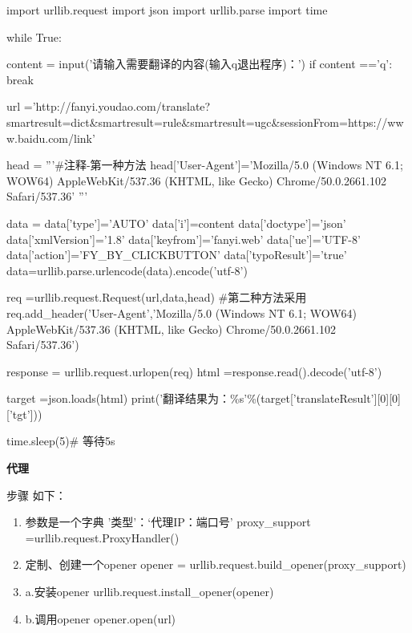 \documentclass[a4paper,10pt]{ctexart}
\begin{document}
\begin{python}

import urllib.request
import json
import urllib.parse
import time


while True:

      content = input('请输入需要翻译的内容(输入q退出程序)：')
      if content =='q':
            break


      url ='http://fanyi.youdao.com/translate?smartresult=dict&smartresult=rule&smartresult=ugc&sessionFrom=https://www.baidu.com/link'


      head ={}
      '''#注释-第一种方法
      head['User-Agent']='Mozilla/5.0 (Windows NT 6.1; WOW64) AppleWebKit/537.36 (KHTML, like Gecko) Chrome/50.0.2661.102 Safari/537.36'
      '''

      data = {}
      data['type']='AUTO'
      data['i']=content
      data['doctype']='json'
      data['xmlVersion']='1.8'
      data['keyfrom']='fanyi.web'
      data['ue']='UTF-8'
      data['action']='FY_BY_CLICKBUTTON'
      data['typoResult']='true'
      data=urllib.parse.urlencode(data).encode('utf-8')

      req =urllib.request.Request(url,data,head)
      #第二种方法采用
      req.add_header('User-Agent','Mozilla/5.0 (Windows NT 6.1; WOW64) AppleWebKit/537.36 (KHTML, like Gecko) Chrome/50.0.2661.102 Safari/537.36')

      response = urllib.request.urlopen(req)
      html =response.read().decode('utf-8')


      target =json.loads(html)
      print('翻译结果为：\%s'\%(target['translateResult'][0][0]['tgt']))

      time.sleep(5)# 等待5s


\end{python}

\textbf{代理}

步骤 如下：\\
\begin{enumerate}
  \item 参数是一个字典 {'类型'：‘代理IP：端口号’}\newline
            proxy\_support =urllib.request.ProxyHandler({})
  \item 定制、创建一个opener\newline
            opener = urllib.request.build\_opener(proxy\_support)
  \item a.安装opener\newline
            urllib.request.install\_opener(opener)
  \item b.调用opener\newline
            opener.open(url)
\end{enumerate}
\end{document}
